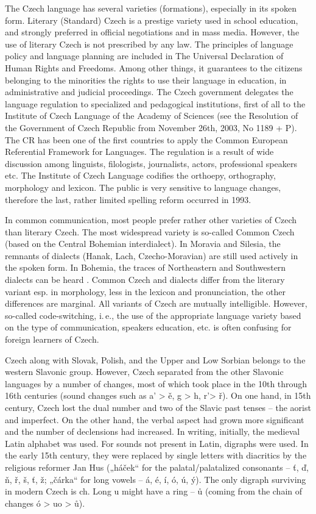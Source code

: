 \begin{multicols}{2}
The Czech language has several varieties (formations), especially in its spoken form. Literary (Standard) Czech is a prestige variety used in school education, and strongly preferred in official negotiations and in mass media. However, the use of literary Czech is not prescribed by any law. The principles of language policy and language planning are included in The Universal Declaration of Human Rights and Freedoms. Among other things, it guarantees to the citizens belonging to the minorities the rights to use their language in education, in administrative and judicial proceedings. The Czech government delegates the language regulation to specialized and pedagogical institutions, first of all to the Institute of Czech Language of the Academy of Sciences (see the Resolution of the Government of Czech Republic from November 26th, 2003, No 1189 + P). The CR has been one of the first countries to apply the Common European Referential Framework for Languages. The regulation is a result of wide discussion among linguists, filologists, journalists, actors, professional speakers etc. The Institute of Czech Language codifies the orthoepy, orthography, morphology and lexicon. The public is very sensitive to language changes, therefore the last, rather limited spelling reform occurred in 1993.

In common communication, most people prefer rather other varieties of Czech than literary Czech. The most widespread variety is so-called Common Czech (based on the Central Bohemian interdialect). In Moravia and Silesia, the remnants of dialects (Hanak, Lach, Czecho-Moravian) are still used actively in the spoken form. In Bohemia, the traces of Northeastern and Southwestern dialects can be heard \cite{Note3}. Common Czech and dialects differ from the literary variant esp. in morphology, less in the lexicon and pronunciation, the other differences are marginal. All variants of Czech are mutually intelligible. However, so-called code-switching, i.\,e., the use of the appropriate language variety based on the type of communication, speakers education, etc. is often confusing for foreign learners of Czech.

Czech along with Slovak, Polish, and the Upper and Low Sorbian belongs to the western Slavonic group. However, Czech separated from the other Slavonic languages by a number of changes, most of which took place in the 10th through 16th centuries (sound changes such as a’ > ě, g > h, r’> ř). On one hand, in 15th century, Czech lost the dual number and two of the Slavic past tenses – the aorist and imperfect. On the other hand, the verbal aspect had grown more significant and the number of declensions had increased. In writing, initially, the medieval Latin alphabet was used. For sounds not present in Latin, digraphs were used. In the early 15th century, they were replaced by single letters with diacritics by the religious reformer Jan Hus („háček“ for the palatal/palatalized consonants – ť, ď, ň, ř, š, ť, ž; „čárka“ for long vowels – á, é, í, ó, ú, ý). The only digraph surviving in modern Czech is ch. Long u might have a ring – ů (coming from the chain of changes ó > uo > ů).
 

\end{multicols}
